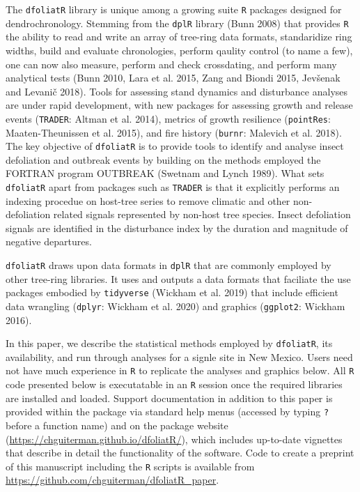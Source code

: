 \documentclass[review]{elsarticle} %
\begin{document}
The \texttt{dfoliatR} library is unique among a growing suite \texttt{R}
packages designed for dendrochronology. Stemming from the \texttt{dplR}
library (Bunn 2008) that provides \texttt{R} the ability to read and
write an array of tree-ring data formats, standaridize ring widths,
build and evaluate chronologies, perform qaulity control (to name a
few), one can now also measure, perform and check crossdating, and
perform many analytical tests (Bunn 2010, Lara et al. 2015, Zang and
Biondi 2015, Jevšenak and Levanič 2018). Tools for assessing stand
dynamics and disturbance analyses are under rapid development, with new
packages for assessing growth and release events (\texttt{TRADER}:
Altman et al. 2014), metrics of growth resilience (\texttt{pointRes}:
Maaten-Theunissen et al. 2015), and fire history (\texttt{burnr}:
Malevich et al. 2018). The key objective of \texttt{dfoliatR} is to
provide tools to identify and analyse insect defoliation and outbreak
events by building on the methods employed the FORTRAN program OUTBREAK
(Swetnam and Lynch 1989). What sets \texttt{dfoliatR} apart from
packages such as \texttt{TRADER} is that it explicitly performs an
indexing procedue on host-tree series to remove climatic and other
non-defoliation related signals represented by non-host tree species.
Insect defoliation signals are identified in the disturbance index by
the duration and magnitude of negative departures.

\texttt{dfoliatR} draws upon data formats in \texttt{dplR} that are
commonly employed by other tree-ring libraries. It uses and outputs a
data formats that faciliate the use packages embodied by
\texttt{tidyverse} (Wickham et al. 2019) that include efficient data
wrangling (\texttt{dplyr}: Wickham et al. 2020) and graphics
(\texttt{ggplot2}: Wickham 2016).

In this paper, we describe the statistical methods employed by
\texttt{dfoliatR}, its availability, and run through analyses for a
signle site in New Mexico. Users need not have much experience in
\texttt{R} to replicate the analyses and graphics below. All \texttt{R}
code presented below is executatable in an \texttt{R} session once the
required libraries are installed and loaded. Support documentation in
addition to this paper is provided within the package via standard help
menus (accessed by typing \texttt{?} before a function name) and on the
package website (\url{https://chguiterman.github.io/dfoliatR/}), which
includes up-to-date vignettes that describe in detail the functionality
of the software. Code to create a preprint of this manuscript including
the \texttt{R} scripts is available from
\url{https://github.com/chguiterman/dfoliatR_paper}.
\end{document}
